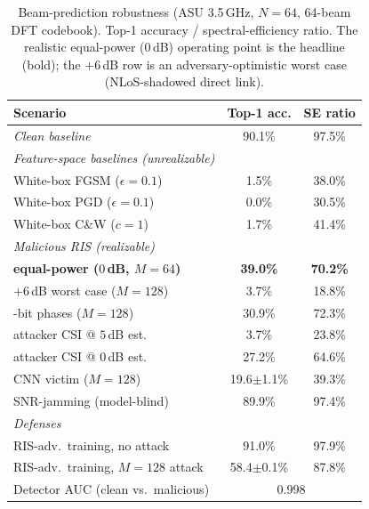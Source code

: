 \begin{table}[t]\centering\caption{Beam-prediction robustness (ASU 3.5\,GHz, $N{=}64$, 64-beam DFT codebook). Top-1 accuracy / spectral-efficiency ratio. The realistic equal-power ($0$\,dB) operating point is the headline (bold); the $+6$\,dB row is an adversary-optimistic worst case (NLoS-shadowed direct link).}\label{tab:main}
\begin{tabular}{lcc}\toprule
Scenario & Top-1 acc. & SE ratio\\\midrule
\emph{Clean baseline} & 90.1\% & 97.5\%\\\midrule
\emph{Feature-space baselines (unrealizable)}\\
\quad White-box FGSM ($\epsilon{=}0.1$) & 1.5\% & 38.0\%\\
\quad White-box PGD ($\epsilon{=}0.1$) & 0.0\% & 30.5\%\\
\quad White-box C\&W ($c{=}1$) & 1.7\% & 41.4\%\\\midrule
\emph{Malicious RIS (realizable)}\\
\quad \textbf{equal-power ($0$\,dB, $M{=}64$)} & \textbf{39.0\%} & \textbf{70.2\%}\\
\quad $+6$\,dB worst case ($M{=}128$) & 3.7\% & 18.8\%\\
\quad 1-bit phases ($M{=}128$) & 30.9\% & 72.3\%\\
\quad attacker CSI @ $5$\,dB est. & 3.7\% & 23.8\%\\
\quad attacker CSI @ $0$\,dB est. & 27.2\% & 64.6\%\\
\quad CNN victim ($M{=}128$) & 19.6$\pm$1.1\% & 39.3\%\\
\quad SNR-jamming (model-blind) & 89.9\% & 97.4\%\\\midrule
\emph{Defenses}\\
\quad RIS-adv.\ training, no attack & 91.0\% & 97.9\%\\
\quad RIS-adv.\ training, $M{=}128$ attack & 58.4$\pm$0.1\% & 87.8\%\\
\quad Detector AUC (clean vs.\ malicious) & \multicolumn{2}{c}{0.998}\\\bottomrule
\end{tabular}\end{table}
